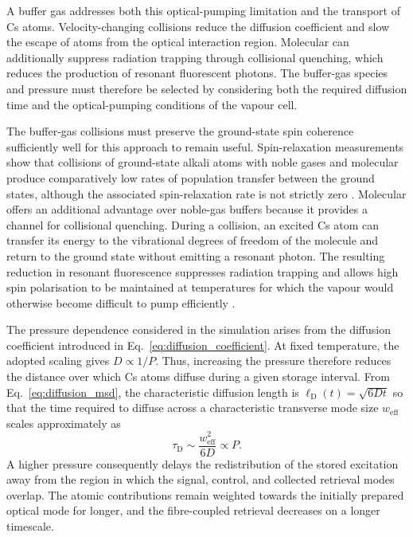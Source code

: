 A buffer gas addresses both this optical-pumping limitation and the transport of Cs atoms. Velocity-changing collisions reduce the diffusion coefficient and slow the escape of atoms from the optical interaction region. Molecular \nitrogen can additionally suppress radiation trapping through collisional quenching, which reduces the production of resonant fluorescent photons. The buffer-gas species and pressure must therefore be selected by considering both the required diffusion time and the optical-pumping conditions of the vapour cell.

The buffer-gas collisions must preserve the ground-state spin coherence sufficiently well for this approach to remain useful. Spin-relaxation measurements show that collisions of ground-state alkali atoms with noble gases and molecular \nitrogen produce comparatively low rates of population transfer between the ground states, although the associated spin-relaxation rate is not strictly zero \cite{HeRmbsrt_ThomasEtAl_2017}. Molecular \nitrogen offers an additional advantage over noble-gas buffers because it provides a channel for collisional quenching. During a collision, an excited Cs atom can transfer its energy to the vibrational degrees of freedom of the \nitrogen molecule and return to the ground state without emitting a resonant photon. The resulting reduction in resonant fluorescence suppresses radiation trapping and allows high spin polarisation to be maintained at temperatures for which the vapour would otherwise become difficult to pump efficiently \cite{HeRmbsrt_ThomasEtAl_2017}.

The pressure dependence considered in the simulation arises from the diffusion coefficient introduced in Eq.~\eqref{eq:diffusion_coefficient}. At fixed temperature, the adopted scaling gives $D\propto 1/ {P}$. Thus, increasing the \nitrogen pressure therefore reduces the distance over which Cs atoms diffuse during a given storage interval. From Eq.~\eqref{eq:diffusion_msd}, the characteristic diffusion length is $ \ell_{\mathrm{D}}(t)=\sqrt{6Dt}$ so that the time required to diffuse across a characteristic transverse mode size \(w_{\mathrm{eff}}\) scales approximately as
%
\[
    \tau_{\mathrm{D}}
    \sim
    \frac{w_{\mathrm{eff}}^{2}}{6D}
    \propto P.
\]
%
A higher pressure consequently delays the redistribution of the stored excitation away from the region in which the signal, control, and collected retrieval modes overlap. The atomic contributions remain weighted towards the initially prepared optical mode for longer, and the fibre-coupled retrieval decreases on a longer timescale.

